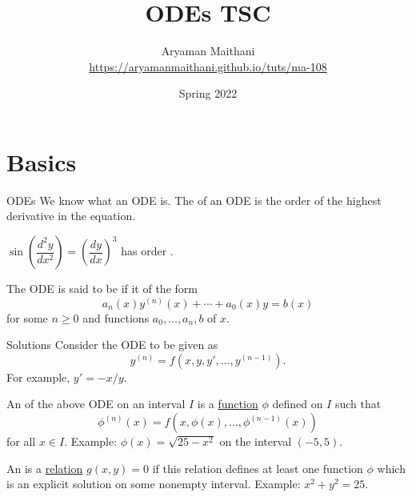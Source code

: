 \documentclass[dvipsnames, handout]{beamer}
\title{ODEs TSC}
\author[Aryaman Maithani]{\texorpdfstring{Aryaman Maithani\\\url{https://aryamanmaithani.github.io/tuts/ma-108}}{Aryaman Maithani}}
\date{Spring 2022}
\institute{IIT Bombay}
\theoremstyle{definition}
\let\ge\geqslant
\begin{document}
\begin{frame}
    \titlepage
\end{frame}



\section{Basics}

\begin{frame}{ODEs}
    We know what an ODE is. \pause The  of an ODE is the order of the highest derivative in the equation. \pause

    $\sin\left(\dfrac{d^{2}y}{dx^{2}}\right) = \left(\dfrac{dy}{dx}\right)^{3}$ has order \underline{\phantom{hello}}. \pause

    The ODE is said to be  if it of the form
    \begin{equation*} 
      a_{n}(x) y^{(n)}(x) + \cdots + a_{0}(x) y = b(x) 
    \end{equation*}
    for some $n \ge 0$ and functions $a_{0}, \ldots, a_{n}, b$ of $x$. 
\end{frame}
\begin{frame}{Solutions}
  Consider the ODE to be given as
  \begin{equation*} 
    y^{(n)} = f(x, y, y', \ldots, y^{(n - 1)}).
  \end{equation*} \pause
  For example, $y' = -x/y$. \pause

  An  of the above ODE on an interval $I$ is a \underline{function} $\phi$ defined on $I$ \pause such that 
  \begin{equation*} 
    \phi^{(n)}(x) = f(x, \phi(x), \ldots, \phi^{(n - 1)}(x))
  \end{equation*}
  for all $x \in I$. \pause Example: $\phi(x) = \sqrt{25 - x^{2}}$ on the interval $(-5, 5)$. \pause

  An  is a \underline{relation} $g(x, y) = 0$ \pause if this relation defines at least one function $\phi$ which is an explicit solution on some nonempty interval. \pause Example: $x^{2} + y^{2} = 25$.
\end{frame}
\end{document}

